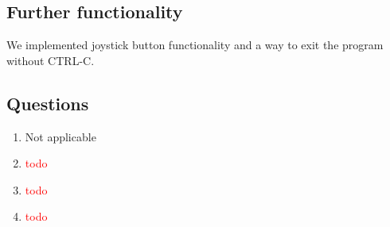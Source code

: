 \documentclass[a4paper,twoside,11pt]{article}
\newcommand{\todo}[1]{{\Large\sc\textcolor{red}{#1}}}
\begin{document}
\subsection{Further functionality}
We implemented joystick button functionality and a way to exit the program without CTRL-C.

\subsection{Questions}
\begin{enumerate}
	\item Not applicable
	\item \todo{todo}
	\item \todo{todo}
	\item \todo{todo}
\end{enumerate}
\end{document}
